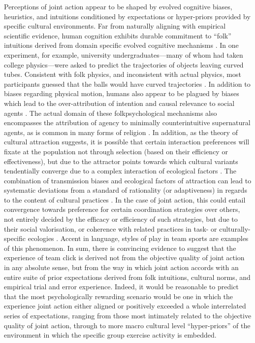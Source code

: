 \begin{mccorrection}
Perceptions of joint action appear to be shaped by evolved cognitive biases, heuristics, and  intuitions conditioned by expectations or hyper-priors provided by specific cultural environments.  Far from naturally aligning with empirical scientific evidence, human cognition exhibits durable commitment to ``folk'' intuitions derived from domain specific evolved cognitive mechanisms \citep{Bloom2007}.  In one experiment, for example, university undergraduates–--many of whom had taken college physics---were asked to predict the trajectories of objects leaving curved tubes. Consistent with folk physics, and inconsistent with actual physics, most participants guessed that the balls would have curved trajectories \citep{McCloskey1980}.
In addition to biases regarding physical motion, humans also appear to be plagued by biases which lead to the over-attribution of intention and causal relevance to social agents \citep{Atran2004}.  The actual domain of these folkpsychological mechanisms also encompasses the attribution of agency to minimally counterintuitive supernatural agents, as is common in many forms of religion \citep{Boyer2001}.
In addition, as the theory of cultural attraction suggests, it is possible that certain interaction preferences will fixate at the population not through selection (based on their efficiency or effectiveness), but due to the attractor points towards which cultural variants tendentially converge due to a complex interaction of ecological factors \citep{Sperber1996,Mesoudi2017}. The combination of transmission biases and ecological factors of attraction can lead to systematic deviations from a standard of rationality (or adaptiveness) in regards to the content of cultural practices \citep{Kahneman2003}.  In the case of joint action, this could entail convergence towards preference for certain coordination strategies over others, not entirely decided by the efficacy or efficiency of such strategies, but due to their social valorisation, or coherence with related practices in task- or culturally-specific ecologies \citep{Claidiere2014}.  Accent in language, styles of play in team sports are examples of this phenomenon.  In sum, there is convincing evidence to suggest that the experience of team click
is derived not from the objective quality of joint action in any absolute sense, but from the way in which joint action accords with an entire suite of prior expectations derived from folk intuitions, cultural norms, and empirical trial and error experience.  Indeed, it would be reasonable to predict that the most psychologically rewarding scenario would be one in which the experience joint action either aligned or positively exceeded a whole interrelated series of expectations, ranging from those most intimately related to the objective quality of joint action, through to more macro cultural level ``hyper-priors'' of the environment in which the specific group exercise activity is embedded.
\end{mccorrection}

